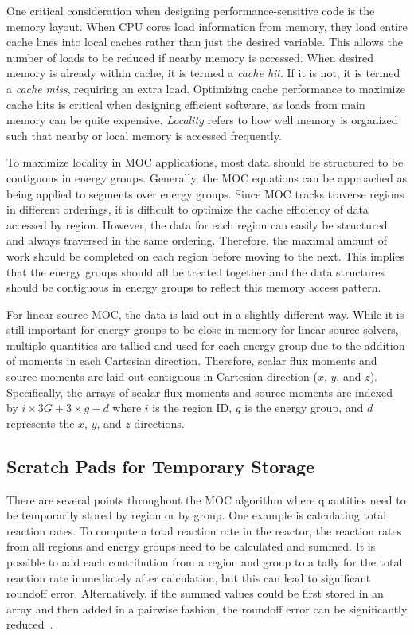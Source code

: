 One critical consideration when designing performance-sensitive code is the memory layout. When CPU cores load information from memory, they load entire cache lines into local caches rather than just the desired variable. This allows the number of loads to be reduced if nearby memory is accessed. When desired memory is already within cache, it is termed a \textit{cache hit}. If it is not, it is termed a \textit{cache miss}, requiring an extra load. Optimizing cache performance to maximize cache hits is critical when designing efficient software, as loads from main memory can be quite expensive. \textit{Locality} refers to how well memory is organized such that nearby or local memory is accessed frequently. 

To maximize locality in \ac{MOC} applications, most data should be structured to be contiguous in energy groups. Generally, the \ac{MOC} equations can be approached as being applied to segments over energy groups. Since \ac{MOC} tracks traverse regions in different orderings, it is difficult to optimize the cache efficiency of data accessed by region. However, the data for each region can easily be structured and always traversed in the same ordering. Therefore, the maximal amount of work should be completed on each region before moving to the next. This implies that the energy groups should all be treated together and the data structures should be contiguous in energy groups to reflect this memory access pattern. 

For linear source \ac{MOC}, the data is laid out in a slightly different way. While it is still important for energy groups to be close in memory for linear source solvers, multiple quantities are tallied and used for each energy group due to the addition of moments in each Cartesian direction. Therefore, scalar flux moments and source moments are laid out contiguous in Cartesian direction ($x$, $y$, and $z$). Specifically, the arrays of scalar flux moments and source moments are indexed by $i\times 3G + 3\times g + d$ where $i$ is the region ID, $g$ is the energy group, and $d$ represents the $x$, $y$, and $z$ directions.

\subsection{Scratch Pads for Temporary Storage}

There are several points throughout the \ac{MOC} algorithm where quantities need to be temporarily stored by region or by group. One example is calculating total reaction rates. To compute a total reaction rate in the reactor, the reaction rates from all regions and energy groups need to be calculated and summed. It is possible to add each contribution from a region and group to a tally for the total reaction rate immediately after calculation, but this can lead to significant roundoff error. Alternatively, if the summed values could be first stored in an array and then added in a pairwise fashion, the roundoff error can be significantly reduced~\cite{pairwise}.

